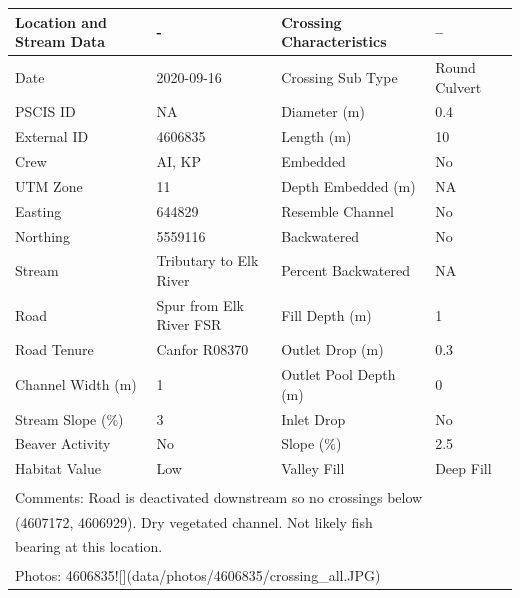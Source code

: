 \documentclass[
]{book}
\begin{document}
\begin{tabular}{llll}
\toprule
Location and Stream Data & - & Crossing Characteristics & --\\
\midrule
Date & 2020-09-16 & Crossing Sub Type & Round Culvert\\
PSCIS ID & NA & Diameter (m) & 0.4\\
External ID & 4606835 & Length (m) & 10\\
Crew & AI, KP & Embedded & No\\
UTM Zone & 11 & Depth Embedded (m) & NA\\
\addlinespace
Easting & 644829 & Resemble Channel & No\\
Northing & 5559116 & Backwatered & No\\
Stream & Tributary to Elk River & Percent Backwatered & NA\\
Road & Spur from Elk River FSR & Fill Depth (m) & 1\\
Road Tenure & Canfor R08370 & Outlet Drop (m) & 0.3\\
\addlinespace
Channel Width (m) & 1 & Outlet Pool Depth (m) & 0\\
Stream Slope (\%) & 3 & Inlet Drop & No\\
Beaver Activity & No & Slope (\%) & 2.5\\
Habitat Value & Low & Valley Fill & Deep Fill\\
\bottomrule
\multicolumn{4}{l}{\textsuperscript{} Comments: Road is deactivated downstream so no crossings below}\\
\multicolumn{4}{l}{(4607172, 4606929). Dry vegetated channel. Not likely fish}\\
\multicolumn{4}{l}{bearing at this location.}\\
\multicolumn{4}{l}{\textsuperscript{} Photos: 4606835![](data/photos/4606835/crossing\_all.JPG)}\\
\end{tabular}
\end{document}
